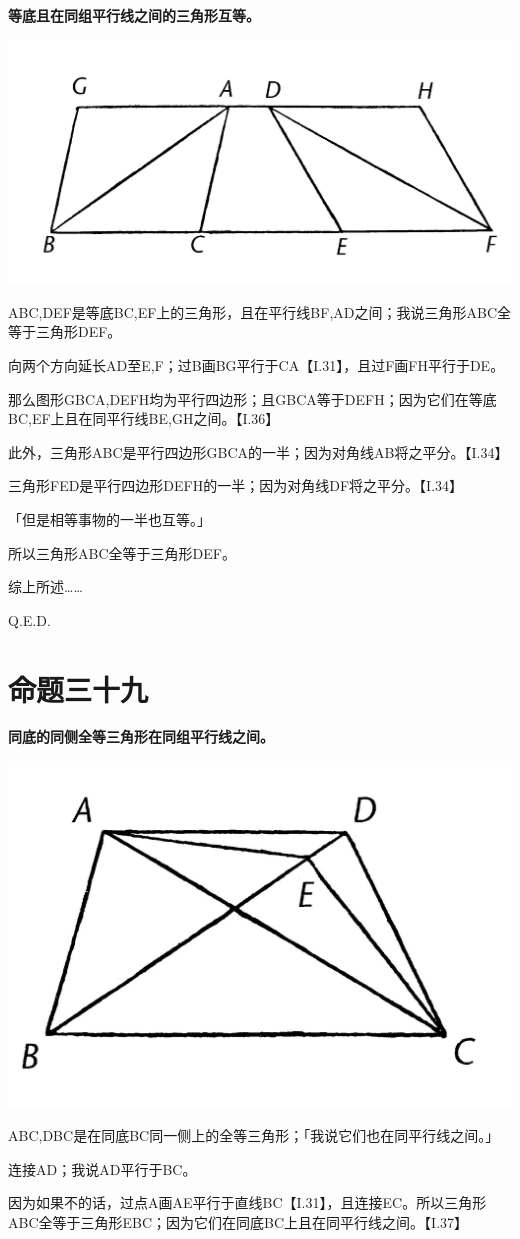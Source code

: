 \documentclass[
]{book}
\begin{document}
\textbf{等底且在同组平行线之间的三角形互等。}

\includegraphics[width=0.5\linewidth]{./image/img534}

ABC,DEF是等底BC,EF上的三角形，且在平行线BF,AD之间；我说三角形ABC全等于三角形DEF。

向两个方向延长AD至E,F；过B画BG平行于CA【I.31】，且过F画FH平行于DE。

那么图形GBCA,DEFH均为平行四边形；且GBCA等于DEFH；因为它们在等底BC,EF上且在同平行线BE,GH之间。【I.36】

此外，三角形ABC是平行四边形GBCA的一半；因为对角线AB将之平分。【I.34】

三角形FED是平行四边形DEFH的一半；因为对角线DF将之平分。【I.34】

「但是相等事物的一半也互等。」

所以三角形ABC全等于三角形DEF。

综上所述\ldots\ldots{}

Q.E.D.

\hypertarget{ux547dux9898ux4e09ux5341ux4e5d}{%
\section{命题三十九}\label{ux547dux9898ux4e09ux5341ux4e5d}}

\textbf{同底的同侧全等三角形在同组平行线之间。}

\includegraphics[width=0.4\linewidth]{./image/img536}

ABC,DBC是在同底BC同一侧上的全等三角形；「我说它们也在同平行线之间。」

连接AD；我说AD平行于BC。

因为如果不的话，过点A画AE平行于直线BC【I.31】，且连接EC。所以三角形ABC全等于三角形EBC；因为它们在同底BC上且在同平行线之间。【I.37】
\end{document}

